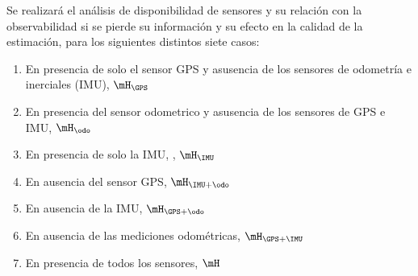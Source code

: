 Se realizará el análisis de disponibilidad de sensores y su relación con la observabilidad si se pierde su información y su efecto en la calidad de la estimación,
para los siguientes distintos siete casos:
\begin{enumerate}
	\item En presencia de solo el sensor GPS y asusencia de los sensores de odometría e inerciales (IMU), $\mH_{\GPS}$
	\item En presencia del sensor odometrico y asusencia de los sensores de GPS e IMU, $\mH_{\odo}$
	\item En presencia de solo la IMU, , $\mH_{\IMU}$
	\item En ausencia del sensor GPS, $\mH_{\IMU+\odo}$
	\item En ausencia de la IMU, $\mH_{\GPS+\odo}$
	\item En ausencia de las mediciones odométricas, $\mH_{\GPS+\IMU}$ 
	\item En presencia de todos los sensores, $\mH$ 
\end{enumerate}

